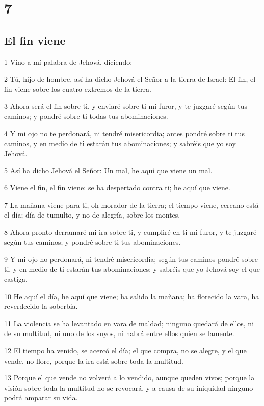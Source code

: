 \chapter{7}

\section*{El fin viene}

\par 1 Vino a mí palabra de Jehová, diciendo:
\par 2 Tú, hijo de hombre, así ha dicho Jehová el Señor a la tierra de Israel: El fin, el fin viene sobre los cuatro extremos de la tierra.
\par 3 Ahora será el fin sobre ti, y enviaré sobre ti mi furor, y te juzgaré según tus caminos; y pondré sobre ti todas tus abominaciones.
\par 4 Y mi ojo no te perdonará, ni tendré misericordia; antes pondré sobre ti tus caminos, y en medio de ti estarán tus abominaciones; y sabréis que yo soy Jehová.
\par 5 Así ha dicho Jehová el Señor: Un mal, he aquí que viene un mal.
\par 6 Viene el fin, el fin viene; se ha despertado contra ti; he aquí que viene.
\par 7 La mañana viene para ti, oh morador de la tierra; el tiempo viene, cercano está el día; día de tumulto, y no de alegría, sobre los montes.
\par 8 Ahora pronto derramaré mi ira sobre ti, y cumpliré en ti mi furor, y te juzgaré según tus caminos; y pondré sobre ti tus abominaciones.
\par 9 Y mi ojo no perdonará, ni tendré misericordia; según tus caminos pondré sobre ti, y en medio de ti estarán tus abominaciones; y sabréis que yo Jehová soy el que castiga.
\par 10 He aquí el día, he aquí que viene; ha salido la mañana; ha florecido la vara, ha reverdecido la soberbia.
\par 11 La violencia se ha levantado en vara de maldad; ninguno quedará de ellos, ni de su multitud, ni uno de los suyos, ni habrá entre ellos quien se lamente.
\par 12 El tiempo ha venido, se acercó el día; el que compra, no se alegre, y el que vende, no llore, porque la ira está sobre toda la multitud.
\par 13 Porque el que vende no volverá a lo vendido, aunque queden vivos; porque la visión sobre toda la multitud no se revocará, y a causa de su iniquidad ninguno podrá amparar su vida.
